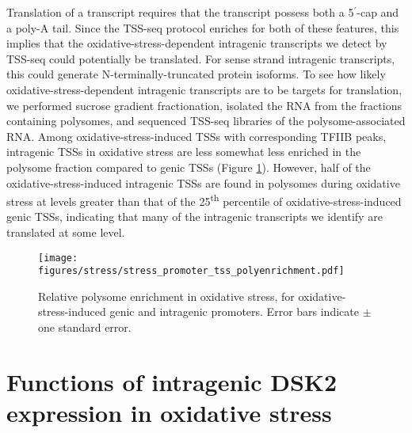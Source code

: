 Translation of a transcript requires that the transcript possess both a 5$^\prime$-cap and a poly-A tail.
Since the TSS-seq protocol enriches for both of these features, this implies that the oxidative-stress-dependent intragenic transcripts we detect by TSS-seq could potentially be translated.
For sense strand intragenic transcripts, this could generate N-terminally-truncated protein isoforms.
To see how likely oxidative-stress-dependent intragenic transcripts are to be targets for translation, we performed sucrose gradient fractionation, isolated the RNA from the fractions containing polysomes, and sequenced TSS-seq libraries of the polysome-associated RNA.
Among oxidative-stress-induced TSSs with corresponding TFIIB peaks, intragenic TSSs in oxidative stress are less somewhat less enriched in the polysome fraction compared to genic TSSs (Figure \ref{fig:stress_promoter_tss_polyenrichment}).
However, half of the oxidative-stress-induced intragenic TSSs are found in polysomes during oxidative stress at levels greater than that of the 25\textsuperscript{th} percentile of oxidative-stress-induced genic TSSs, indicating that many of the intragenic transcripts we identify are translated at some level.

\begin{figure}[h]
    \texttt{[image: figures/stress/stress\_promoter\_tss\_polyenrichment.pdf]}
    \caption[Relative polysome enrichment in oxidative stress, for oxidative-stress-induced genic and intragenic promoters.]{Relative polysome enrichment in oxidative stress, for oxidative-stress-induced genic and intragenic promoters. Error bars indicate $\pm$ one standard error.}
    \label{fig:stress_promoter_tss_polyenrichment}
\end{figure}

\section{Functions of intragenic DSK2 expression in oxidative stress}

